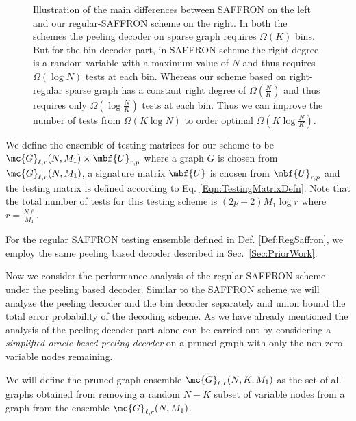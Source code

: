 \documentclass[conference,,twocolumn]{IEEEtran}
\begin{document}
\begin{figure*}[t!]
\centering \scalebox{1}{}
\caption{Illustration of the main differences between SAFFRON \cite{lee2015saffron} on the left and our regular-SAFFRON scheme on the right. In both the schemes the peeling decoder on sparse graph requires $\Omega(K)$ bins. But for the bin decoder part, in SAFFRON scheme the right degree is a random variable with a maximum value of $N$ and thus requires $\Omega(\log N)$ tests at each bin. Whereas our scheme based on right-regular sparse graph has a constant right degree of $\Omega(\frac{N}{K})$ and thus requires only $\Omega(\log \frac{N}{K})$ tests at each bin. Thus we can improve the number of tests from $\Omega (K\log N)$ to order optimal $\Omega(K\log \frac{N}{K})$.}
\end{figure*}

\begin{definition}
\label{Def:RegSaffron}
We define the ensemble of testing matrices for our scheme to be $\mc{G}_{\ell,r}(N,M_1)\times \mbf{U}_{r,p}$ where a graph $G$ is chosen from $\mc{G}_{\ell,r}(N,M_1)$, a signature matrix $\mbf{U}$ is chosen from $\mbf{U}_{r,p}$ and the testing matrix is defined according to Eq. \eqref{Eqn:TestingMatrixDefn}. Note that the total number of tests for this testing scheme is $(2p+2)M_1\log r$ where $r=\frac{N\ell}{M_1}$.
\end{definition}

For the regular SAFFRON testing ensemble defined in Def. \ref{Def:RegSaffron}, we employ the same peeling based decoder described in Sec.~\ref{Sec:PriorWork}. 

Now we consider the performance analysis of the regular SAFFRON scheme under the peeling based decoder. Similar to the SAFFRON scheme we will analyze the peeling decoder and the bin decoder separately and union bound the total error probability of the decoding scheme. As we have already mentioned the analysis of the peeling decoder part alone can be carried out by considering a \textit{simplified oracle-based peeling decoder} on a pruned graph with only the non-zero variable nodes remaining. 

\begin{definition}
We will define the pruned graph ensemble $\tilde{\mc{G}}_{\ell,r}(N,K,M_1)$ as the set of all graphs obtained from removing a random $N-K$ subset of variable nodes from a graph from the ensemble $\mc{G}_{\ell,r}(N,M_1)$.
\end{definition}
\end{document}
